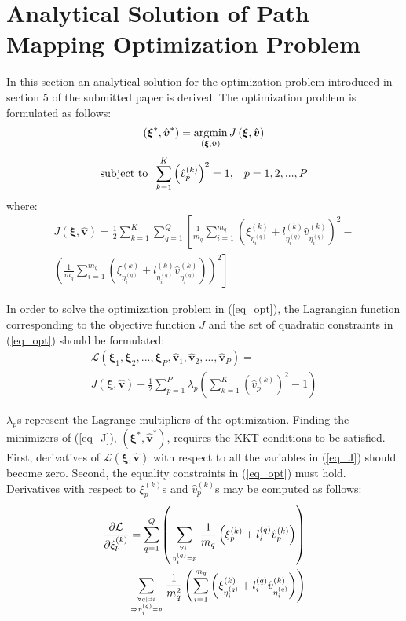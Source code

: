 \documentclass[10pt,journal,cspaper,compsoc]{IEEEtran}
\begin{document}
\section{Analytical Solution of Path Mapping Optimization Problem}
In this section an analytical solution for the optimization problem introduced in section 5 of the submitted paper is derived. The optimization problem is formulated as follows:
\begin{align}
(\boldsymbol{\xi}^*,\hat{\boldsymbol{v}}^*)=\mathop{\textrm{argmin}}_{(\boldsymbol{\xi},\hat{\boldsymbol{v}})}J\left(\boldsymbol{\xi},\hat{\boldsymbol{v}}\right) \nonumber
\end{align}
\begin{equation}
\label{eq_opt}
\mathop{\textrm{subject to}} \hspace{2mm} \sum_{k=1}^{K}\left(\hat{v}_p^{(k)}\right)^2=1, \hspace{3mm} p=1,2,...,P
\end{equation}
where:
\begin{align}
\label{eq_J}
J\left(\boldsymbol{\xi},\hat{\boldsymbol{v}}\right) = \frac{1}{2}\sum_{k=1}^{K}\sum_{q=1}^{Q}\left[\frac{1}{m_q}\sum_{i=1}^{m_q}\left(\xi_{\eta_i^{(q)}}^{(k)}+l_{\eta_i^{(q)}}^{(k)}\hat{v}_{\eta_i^{(q)}}^{(k)}\right)^2-\right.
\nonumber \\
\left.\left(\frac{1}{m_q}\sum_{i=1}^{m_q}\left(\xi_{\eta_i^{(q)}}^{(k)}+l_{\eta_i^{(q)}}^{(k)}\hat{v}_{\eta_i^{(q)}}^{(k)}\right)\right)^2\right]
\end{align}

In order to solve the optimization problem in (\ref{eq_opt}), the Lagrangian function corresponding to the objective function $J$ and the set of quadratic constraints in (\ref{eq_opt}) should be formulated:
\begin{align}
\label{eq37}
\mathcal{L}\left(\boldsymbol{\xi}_1,\boldsymbol{\xi}_2,...,\boldsymbol{\xi}_P,\hat{\boldsymbol{v}}_1,\hat{\boldsymbol{v}}_2,...,\hat{\boldsymbol{v}}_P\right)=
\nonumber \\
J\left(\boldsymbol{\xi},\hat{\boldsymbol{v}}\right)-\frac{1}{2}\sum_{p=1}^{P}\lambda_p\left(\sum_{k=1}^{K}\left(\hat{v}_p^{(k)}\right)^2-1\right)
\end{align}

$\lambda_p$s represent the Lagrange multipliers of the optimization. Finding the minimizers of (\ref{eq_J}), $\left(\boldsymbol{\xi}^*,\hat{\boldsymbol{v}}^*\right)$, requires the KKT conditions to be satisfied. First, derivatives of $\mathcal{L}\left(\boldsymbol{\xi},\hat{\boldsymbol{v}}\right)$ with respect to all the variables in (\ref{eq_J}) should become zero. Second, the equality constraints in (\ref{eq_opt}) must hold. Derivatives with respect to $\xi_p^{(k)}$s and $\hat{v}_p^{(k)}$s may be computed as follows:
\begin{align}
\label{eq38}
\frac{\partial\mathcal{L}}{\partial\xi_p^{(k)}}=\sum_{q=1}^{Q}\left(\sum_{\forall i|\atop \eta_i^{(q)}=p}\frac{1}{m_q}\left(\xi_p^{(k)}+l_i^{(q)}\hat{v}_p^{(k)}\right)\right)
\nonumber \\
-\sum_{\forall q|\exists i\atop \Rightarrow \eta_i^{(q)}=p}\frac{1}{m_q^2}\left(\sum_{i=1}^{m_q}\left(\xi_{\eta_i^{(q)}}^{(k)}+l_i^{(q)}\hat{v}_{\eta_i^{(q)}}^{(k)}\right)\right)
\end{align}
\end{document}
